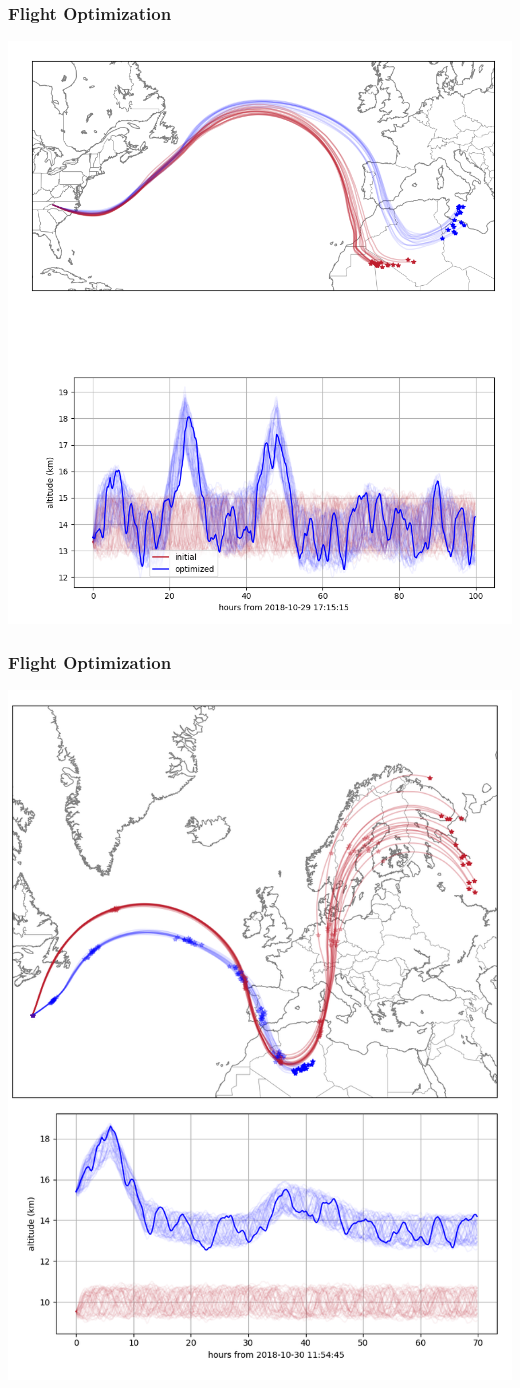 \documentclass[10pt,mathserif]{beamer}
\begin{document}
\begin{frame}
\frametitle{Flight Optimization}
\begin{center}
\includegraphics[width=.6\linewidth,trim={0 0cm 0 0cm},clip]{f4.png}
\end{center}
\end{frame}
\begin{frame}
\frametitle{Flight Optimization}
\begin{center}
\includegraphics[width=.6\linewidth,trim={0 0cm 0 0cm},clip]{f5.png}
\end{center}
\end{frame}
\end{document}
